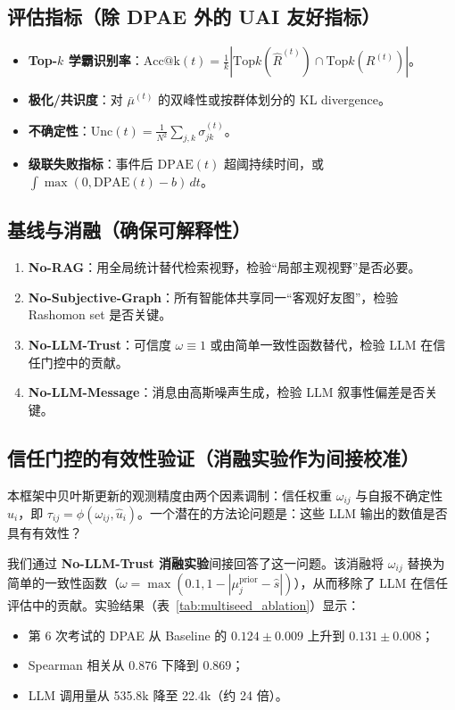 \documentclass[UTF8, a4paper, 11pt]{ctexart}
\begin{document}
\subsection{评估指标（除 DPAE 外的 UAI 友好指标）}
\begin{itemize}
    \item \textbf{Top-$k$ 学霸识别率}：\(\text{Acc@k}(t)=\frac{1}{k}|\text{Top}k(\hat{R}^{(t)})\cap \text{Top}k(R^{(t)})|\)。
    \item \textbf{极化/共识度}：对 \(\bar{\mu}^{(t)}\) 的双峰性或按群体划分的 KL divergence。
    \item \textbf{不确定性}：\(\text{Unc}(t)=\frac{1}{N^2}\sum_{j,k}\sigma_{jk}^{(t)}\)。
    \item \textbf{级联失败指标}：事件后 \(\text{DPAE}(t)\) 超阈持续时间，或 \(\int \max(0,\text{DPAE}(t)-b)\,dt\)。
\end{itemize}

\subsection{基线与消融（确保可解释性）}
\begin{enumerate}
    \item \textbf{No-RAG}：用全局统计替代检索视野，检验“局部主观视野”是否必要。
    \item \textbf{No-Subjective-Graph}：所有智能体共享同一“客观好友图”，检验 Rashomon set 是否关键。
    \item \textbf{No-LLM-Trust}：可信度 \(\omega\equiv 1\) 或由简单一致性函数替代，检验 LLM 在信任门控中的贡献。
    \item \textbf{No-LLM-Message}：消息由高斯噪声生成，检验 LLM 叙事性偏差是否关键。
\end{enumerate}

\subsection{信任门控的有效性验证（消融实验作为间接校准）}
本框架中贝叶斯更新的观测精度由两个因素调制：信任权重 $\omega_{ij}$ 与自报不确定性 $\hat{u}_i$，即 $\tau_{ij} = \phi(\omega_{ij}, \hat{u}_i)$。一个潜在的方法论问题是：这些 LLM 输出的数值是否具有有效性？

我们通过 \textbf{No-LLM-Trust 消融实验}间接回答了这一问题。该消融将 $\omega_{ij}$ 替换为简单的一致性函数（$\omega = \max(0.1, 1-|\mu_j^{\text{prior}} - \hat{s}|)$），从而移除了 LLM 在信任评估中的贡献。实验结果（表~\ref{tab:multiseed_ablation}）显示：
\begin{itemize}
    \item 第 6 次考试的 DPAE 从 Baseline 的 $0.124\pm0.009$ 上升到 $0.131\pm0.008$；
    \item Spearman 相关从 $0.876$ 下降到 $0.869$；
    \item LLM 调用量从 535.8k 降至 22.4k（约 24 倍）。
\end{itemize}
\end{document}
